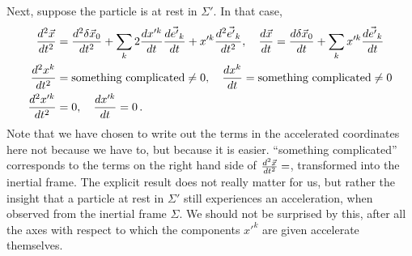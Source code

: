 \documentclass[../class_mech_main.tex]{subfiles}
\begin{document}
\begin{itemize}
	Next, suppose the particle is at rest in $\Sigma'$. In that case,
	\begin{align*}
		\dv[2]{\vec{x}}{t} &= \dv[2]{\delta \vec{x}_0}{t} + \sum_k 2 \dv{x'^k}{t} \dv{\vec{e'}_k}{t} + x'^k \dv[2]{\vec{e'}_k}{t},
		\quad \dv{\vec{x}}{t} = \dv{\delta \vec{x}_0}{t} + \sum_k x'^k \dv{\vec{e'}_k}{t}
		\\
		\dv[2]{x^k}{t} &= \text{something complicated} \neq 0,
		\quad \dv{x^k}{t} = \text{something complicated} \neq 0
		\\
		\dv[2]{x'^k}{t} &= 0, \quad \dv{x'^k}{t} = 0 \, .
	\end{align*}
	Note that we have chosen to write out the terms in the accelerated coordinates here not because we have to, but because it is easier. \enquote{something complicated} corresponds to the terms on the right hand side of $\dv[2]{\vec{x}}{t} = $, transformed into the inertial frame. The explicit result does not really matter for us, but rather the insight that a particle at rest in $\Sigma'$ still experiences an acceleration, when observed from the inertial frame $\Sigma$. We should not be surprised by this, after all the axes with respect to which the components $x'^k$ are given accelerate themselves.

	


\end{itemize}
\end{document}
